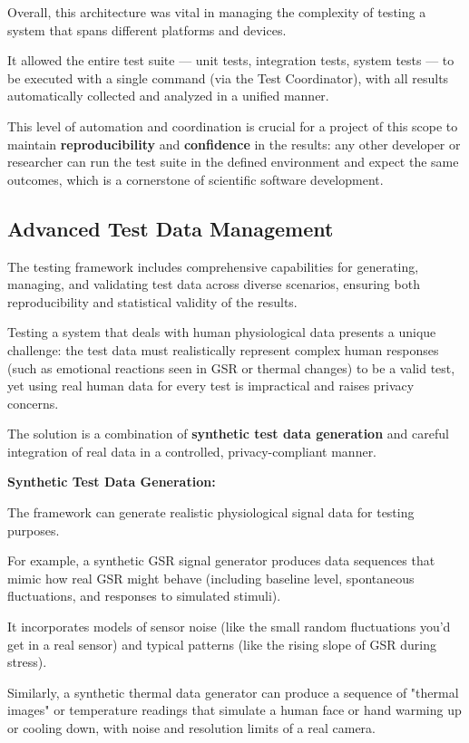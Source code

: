 {{{Overall, this architecture was vital in managing the complexity of testing a system that spans different platforms and devices.

It allowed the entire test suite --- unit tests, integration tests, system tests --- to be executed with a single command (via the Test Coordinator), with all results automatically collected and analyzed in a unified manner.

This level of automation and coordination is crucial for a project of this scope to maintain \textbf{reproducibility}
 and \textbf{confidence}
 in the results: any other developer or researcher can run the test suite in the defined environment and expect the same outcomes, which is a cornerstone of scientific software development.

\subsection{Advanced Test Data Management}

The testing framework includes comprehensive capabilities for generating, managing, and validating test data across diverse scenarios, ensuring both reproducibility and statistical validity of the results.

Testing a system that deals with human physiological data presents a unique challenge: the test data must realistically represent complex human responses (such as emotional reactions seen in GSR or thermal changes) to be a valid test, yet using real human data for every test is impractical and raises privacy concerns.

The solution is a combination of \textbf{synthetic test data generation}
 and careful integration of real data in a controlled, privacy-compliant manner.

\textbf{Synthetic Test Data Generation:}

The framework can generate realistic physiological signal data for testing purposes.

For example, a synthetic GSR signal generator produces data sequences that mimic how real GSR might behave (including baseline level, spontaneous fluctuations, and responses to simulated stimuli).

It incorporates models of sensor noise (like the small random fluctuations you'd get in a real sensor) and typical patterns (like the rising slope of GSR during stress).

Similarly, a synthetic thermal data generator can produce a sequence of "thermal images" or temperature readings that simulate a human face or hand warming up or cooling down, with noise and resolution limits of a real camera.

}}}

